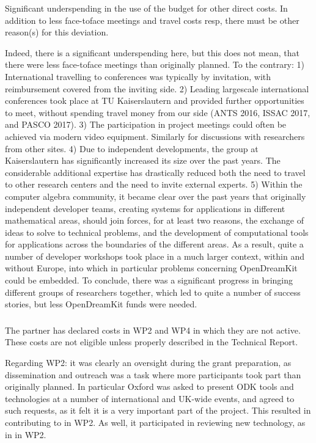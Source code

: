 \begin{itemize}
\begin{EUcomment}
  Significant underspending in the use of the budget for other direct
  costs. In addition to less face-toface meetings and travel costs
  resp, there must be other reason(s) for this deviation.
\end{EUcomment}
Indeed, there is a significant underspending here, but this does not mean, that there were less face-toface
meetings than originally planned. To the contrary: 1) International travelling to conferences was typically 
by invitation, with reimbursement covered from the inviting side. 2) Leading largescale international conferences 
took place at TU Kaiserslautern and provided further opportunities to meet, without spending travel money from our 
side (ANTS 2016, ISSAC 2017, and PASCO 2017). 3) The participation in project meetings could often be achieved 
via modern video equipment. Similarly for discussions with researchers from other sites. 4) Due to independent 
developments, the group at Kaiserslautern has significantly increased its size over the past years. 
The considerable additional expertise has drastically reduced both the need to travel to other research centers 
and the need to invite external experts. 5) Within the computer algebra community, it became clear over the past 
years that originally independent developer teams, creating systems for applications in different mathematical 
areas, should join forces, for at least two reasons, the exchange of ideas to solve to  technical problems, and
the development of computational tools for applications across the boundaries of the different areas. As a result, 
quite a number of developer workshops took place in a much larger context, within and without Europe, into 
which in particular problems concerning OpenDreamKit could be embedded. To conclude, there was a significant 
progress in bringing different groups of researchers together, which led to quite a number of success stories, 
but less OpenDreamKit funds were needed.

\subsubsection{}
\begin{EUcomment}
  The partner has declared costs in WP2 and WP4 in which they are not
  active. These costs are not eligible unless properly described in
  the Technical Report.
\end{EUcomment}
Regarding WP2: it was clearly an oversight during the grant preparation, as dissemination and 
outreach was a task where more participants took part than originally planned. In particular Oxford 
was asked to present ODK tools and technologies at a number of international and UK-wide events,
and agreed to such requests, as it felt it is a very important part of the project. This resulted 
in contributing to  in WP2. As well, it participated in reviewing
new technology, as in  in WP2.


\end{itemize}
